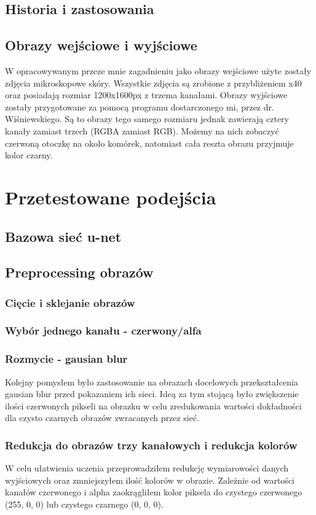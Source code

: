\documentclass{article}
\begin{document}
\subsection{Historia i zastosowania}
\subsection{Obrazy wejściowe i wyjściowe}
W opracowywanym przeze mnie zagadnieniu jako obrazy wejściowe użyte zostały zdjęcia mikroskopowe skóry.
Wszystkie zdjęcia są zrobione z przybliżeniem x40 oraz posiadają rozmiar 1200x1600px z trzema kanałami.
Obrazy wyjściowe zostały przygotowane za pomocą programu dostarczonego mi, przez dr. Wiśniewskiego.
Są to obrazy tego samego rozmiaru jednak zawierają cztery kanały zamiast trzech (RGBA zamiast RGB).
Możemy na nich zobaczyć czerwoną otoczkę na około komórek, natomiast cała reszta obrazu przyjmuje kolor czarny.
\newpage
\section{Przetestowane podejścia}
\subsection{Bazowa sieć u-net}
\subsection{Preprocessing obrazów}
\subsubsection{Cięcie i sklejanie obrazów}
\subsubsection{Wybór jednego kanału - czerwony/alfa}
\subsubsection{Rozmycie - gausian blur}
Kolejny pomysłem było zastosowanie na obrazach docelowych przekształcenia gausian blur przed pokazaniem ich sieci.
Ideą za tym stojącą było zwiększenie ilości czerwonych pikseli na obrazku w celu zredukowania wartości dokładności dla czysto czarnych obrazów zwracanych przez sieć.
\subsubsection{Redukcja do obrazów trzy kanałowych i redukcja kolorów}
W celu ułatwienia uczenia przeprowadziłem redukcję wymiarowości danych wyjściowych oraz zmniejszyłem ilość kolorów w obrazie.
Zależnie od wartości kanałów czerwonego i alpha zaokrągliłem kolor piksela do czystego czerwonego (255, 0, 0) lub czystego czarnego (0, 0, 0).
\end{document}
